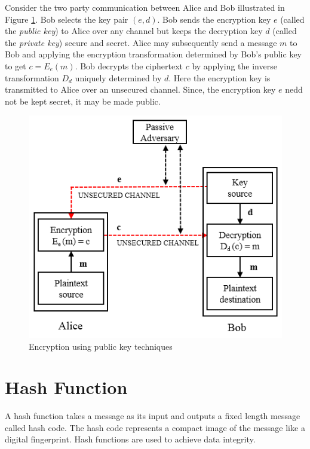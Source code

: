 Consider the two party communication between Alice and Bob illustrated in Figure \ref{fig:public-key}. 
Bob selects the key pair $(e, d)$. 
Bob sends the encryption key $e$ (called the \textit{public key}) to Alice over any channel but keeps the decryption key $d$ (called the \textit{private key}) secure and secret.
Alice may subsequently send a message $m$ to Bob and applying the encryption transformation determined by Bob's public key to get $c = E_{e}(m)$.
Bob decrypts the ciphertext $c$ by applying the inverse transformation $D_{d}$ uniquely determined by $d$.
Here the encryption key is transmitted to Alice over an unsecured channel.
Since, the encryption key $e$ nedd not be kept secret, it may be made public.
\begin{figure}[h!]
	\centering
	\includegraphics{images/public-key.png}
	\caption{Encryption using public key techniques}
	\label{fig:public-key}
\end{figure}

\section{Hash Function}
	A hash function takes a message as its input and outputs a fixed length message called hash code.
	The hash code represents a compact image of the message like a digital fingerprint.
	Hash functions are used to achieve data integrity.


